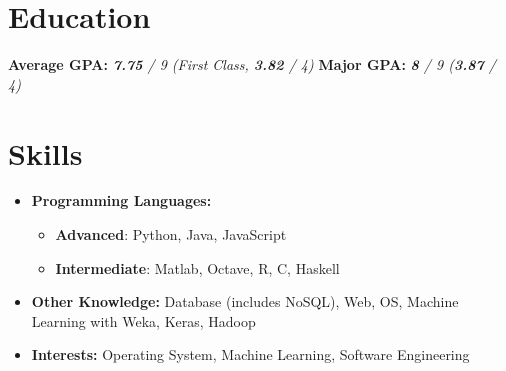 \documentclass{resume}
\begin{document}



\section{Education}
\textbf{Average GPA:} \textit{\textbf{7.75} / 9 (First Class, \textbf{3.82} / 4)} \hspace{0.6cm} \textbf{Major GPA:} \textit{\textbf{8} / 9 (\textbf{3.87} / 4)}

\section{Skills}
\begin{itemize}[parsep=0.5ex]
  \item \textbf{Programming Languages:} 
  \begin{itemize}
    \item \textbf{Advanced}: Python, Java, JavaScript
    \item \textbf{Intermediate}: Matlab, Octave, R, C, Haskell
  \end{itemize}
  \item \textbf{Other Knowledge:} Database (includes NoSQL), Web, OS, Machine Learning with Weka, Keras, Hadoop
  \item \textbf{Interests:} Operating System, Machine Learning, Software Engineering
\end{itemize}
\end{document}
